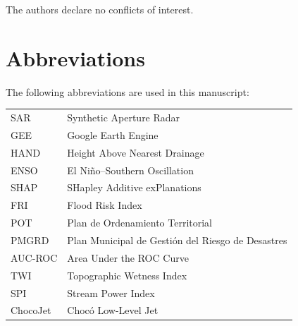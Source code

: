 \documentclass{article}
\begin{document}
The authors declare no conflicts of interest.

\section*{Abbreviations}

The following abbreviations are used in this manuscript:\\

\noindent
\begin{tabular}{@{}ll}
SAR & Synthetic Aperture Radar\\
GEE & Google Earth Engine\\
HAND & Height Above Nearest Drainage\\
ENSO & El Ni\~no--Southern Oscillation\\
SHAP & SHapley Additive exPlanations\\
FRI & Flood Risk Index\\
POT & Plan de Ordenamiento Territorial\\
PMGRD & Plan Municipal de Gesti\'on del Riesgo de Desastres\\
AUC-ROC & Area Under the ROC Curve\\
TWI & Topographic Wetness Index\\
SPI & Stream Power Index\\
ChocoJet & Choc\'o Low-Level Jet
\end{tabular}




\end{document}
